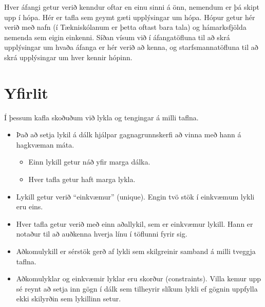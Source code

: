 \begin{example}
\caption[Hópar]{Hver áfangi getur verið kenndur oftar en einu sinni á önn, nemendum er þá skipt upp í hópa. Hér er tafla sem geymt gæti upplýsingar um hópa. Hópur getur hér verið með nafn (í Tækniskólanum er þetta oftast bara tala) og hámarksfjölda nemenda sem eigin einkenni. Síðan vísum við í áfangatöfluna til að skrá upplýsingar um hvaða áfanga er hér verið að kenna, og starfsmannatöfluna til að skrá upplýsingar um hver kennir hópinn.}
\label{sql:k5d5-hopar}
\centering
{}
\end{example}


\section{Yfirlit}
Í þessum kafla skoðuðum við lykla og tengingar á milli taflna.

\begin{itemize}
 \item Það að setja lykil á dálk hjálpar gagnagrunnskerfi að vinna með hann á hagkvæman máta.
 \begin{itemize}
  \item Einn lykill getur náð yfir marga dálka.
  \item Hver tafla getur haft marga lykla.
 \end{itemize}
 \item Lykill getur verið ``einkvæmur'' (unique). Engin tvö stök í einkvæmum lykli eru eins.
 \item Hver tafla getur verið með einn aðallykil, sem er einkvæmur lykill. Hann er notaður til að auðkenna hverja línu í töflunni fyrir sig.
 \item Aðkomulykill er sérstök gerð af lykli sem skilgreinir samband á milli tveggja taflna.
 \item Aðkomulyklar og einkvæmir lyklar eru skorður (constraints). Villa kemur upp sé reynt að setja inn gögn í dálk sem tilheyrir slíkum lykli ef gögnin uppfylla ekki skilyrðin sem lykillinn setur.
\end{itemize}





